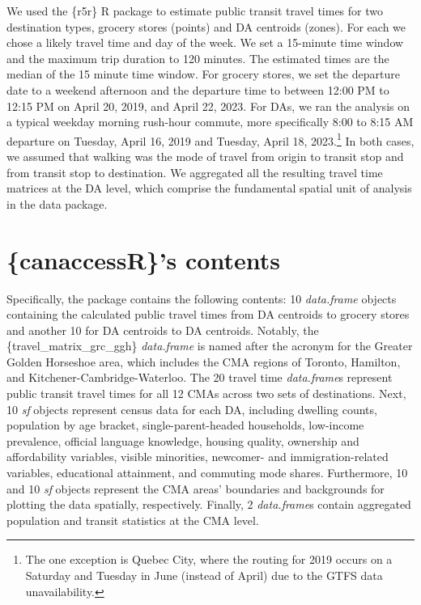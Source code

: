 \documentclass[Royal,times,sageh]{sagej}
\begin{document}
We used the \{r5r\} R package to estimate public transit travel times
for two destination types, grocery stores (points) and DA centroids
(zones). For each we chose a likely travel time and day of the week. We
set a 15-minute time window and the maximum trip duration to 120
minutes. The estimated times are the median of the 15 minute time
window. For grocery stores, we set the departure date to a weekend
afternoon and the departure time to between 12:00 PM to 12:15 PM on
April 20, 2019, and April 22, 2023. For DAs, we ran the analysis on a
typical weekday morning rush-hour commute, more specifically 8:00 to
8:15 AM departure on Tuesday, April 16, 2019 and Tuesday, April 18,
2023.\footnote{The one exception is Quebec City, where the routing for
  2019 occurs on a Saturday and Tuesday in June (instead of April) due
  to the GTFS data unavailability.} In both cases, we assumed that
walking was the mode of travel from origin to transit stop and from
transit stop to destination. We aggregated all the resulting travel time
matrices at the DA level, which comprise the fundamental spatial unit of
analysis in the data package.

\section{\{canaccessR\}'s contents}\label{canaccessrs-contents}

Specifically, the package contains the following contents: 10
\emph{data.frame} objects containing the calculated public travel times
from DA centroids to grocery stores and another 10 for DA centroids to
DA centroids. Notably, the \{travel\_matrix\_grc\_ggh\}
\emph{data.frame} is named after the acronym for the Greater Golden
Horseshoe area, which includes the CMA regions of Toronto, Hamilton, and
Kitchener-Cambridge-Waterloo. The 20 travel time \emph{data.frame}s
represent public transit travel times for all 12 CMAs across two sets of
destinations. Next, 10 \emph{sf} objects represent census data for each
DA, including dwelling counts, population by age bracket,
single-parent-headed households, low-income prevalence, official
language knowledge, housing quality, ownership and affordability
variables, visible minorities, newcomer- and immigration-related
variables, educational attainment, and commuting mode shares.
Furthermore, 10 and 10 \emph{sf} objects represent the CMA areas'
boundaries and backgrounds for plotting the data spatially,
respectively. Finally, 2 \emph{data.frame}s contain aggregated
population and transit statistics at the CMA level.
\end{document}
